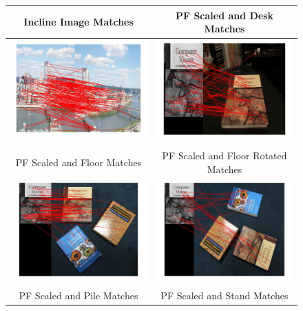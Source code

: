\documentclass[12pt]{article}\sloppy
\begin{document}
\begin{figure}[f]
\centering
\begin{tabular}{| c | c |}
  \hline
  Incline Image Matches & PF Scaled and Desk Matches \\
  \hline
  \includegraphics[width=0.42\linewidth]{../results/ImageMatchIncline.jpg} & \includegraphics[width=0.42\linewidth]{../results/ImageMatchPFDesk.jpg} \\
  \hline
  PF Scaled and Floor Matches & PF Scaled and Floor Rotated Matches \\
  \hline
  \includegraphics[width=0.42\linewidth]{../results/ImageMatchPFFloor.jpg} & \includegraphics[width=0.42\linewidth]{../results/ImageMatchPFFloorRotate.jpg} \\
  \hline
  PF Scaled and Pile Matches & PF Scaled and Stand Matches \\

\end{tabular}
\end{figure}
\end{document}
